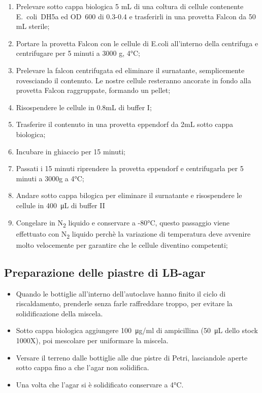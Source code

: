 \begin{enumerate}

	\item Prelevare sotto cappa biologica 5 mL di una coltura di cellule
  contenente E.~coli~DH5a ed OD~600 di 0.3-0.4 e trasferirli in
  una provetta Falcon da 50 mL sterile;

  \item Portare la provetta Falcon con le cellule di E.coli all'interno della centrifuga
  e centrifugare per 5 minuti a 3000 g, 4°C;

  \item Prelevare la falcon centrifugata ed eliminare il surnatante, semplicemente
  rovesciando il contenuto. Le nostre cellule resteranno ancorate in fondo alla provetta
  Falcon raggruppate, formando un pellet;

  \item Risospendere le cellule in 0.8mL di buffer I;

  \item Trasferire il contenuto in una provetta eppendorf da 2mL sotto cappa biologica;

  \item Incubare in ghiaccio per 15 minuti;

  \item Passati i 15 minuti riprendere la provetta eppendorf e centrifugarla per 5 minuti a 3000g a 4°C;

  \item Andare sotto cappa bilogica per eliminare il surnatante e risospendere
  le cellule in \SI{400}{\micro\liter} di buffer II

  \item Congelare in N\textsubscript2 liquido e conservare a -80°C,
  questo passaggio viene effettuato con N\textsubscript2 liquido perchè
  la variazione di temperatura deve avvenire molto velocemente per garantire
  che le cellule diventino competenti;

\end{enumerate}

\subsection{Preparazione delle piastre di LB-agar}

\begin{itemize}
  \item Quando le bottiglie all'interno dell'autoclave hanno finito il ciclo di riscaldamento,
  prenderle senza farle raffreddare troppo, per evitare la solidificazione della miscela.
  \item Sotto cappa biologica aggiungere \SI{100}{\micro\gram}/ml di ampicillina
  (\SI{50}{\micro\liter} dello stock 1000X), poi mescolare per uniformare la miscela.
  \item Versare il terreno dalle bottiglie alle due pistre di Petri,
  lasciandole aperte sotto cappa fino a che l'agar non solidifica.
  \item Una volta che l'agar si è solidificato conservare a 4°C.
\end{itemize}



